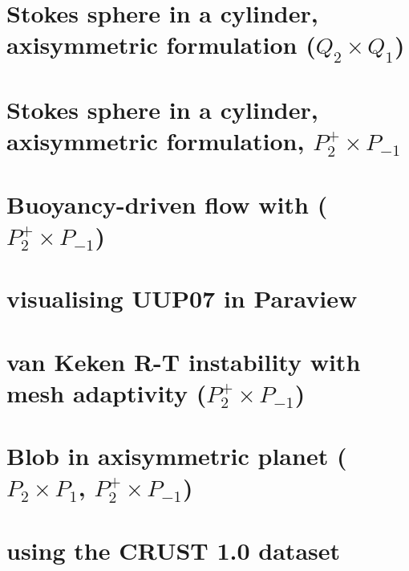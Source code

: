 \documentclass[a4paper,11pt]{report}
\begin{document}
\chapter{Stokes sphere in a cylinder, axisymmetric formulation ($Q_2\times Q_1$) \label{f91}} %

\chapter{Stokes sphere in a cylinder, axisymmetric formulation, $P_2^+\times P_{-1}$ \label{f92}} %

\chapter{Buoyancy-driven flow with ($P_2^+\times P_{-1}$) \label{f93}} %

\chapter{visualising UUP07 in Paraview \label{f94}} %

\chapter{van Keken \etal R-T instability with mesh adaptivity ($P_2^+\times P_{-1}$) \label{f95}} %

\chapter{Blob in axisymmetric planet ($P_2\times P_1$, $P_2^+\times P_{-1}$) \label{f96}} %

\chapter{using the CRUST 1.0 dataset \label{f97}} %
\end{document}
